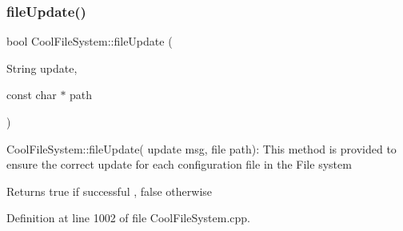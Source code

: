 \subsubsection{\texorpdfstring{file\+Update()}{fileUpdate()}}
{\footnotesize\ttfamily bool Cool\+File\+System\+::file\+Update (\begin{DoxyParamCaption}\item[{String}]{update,  }\item[{const char $\ast$}]{path }\end{DoxyParamCaption})}

Cool\+File\+System\+::file\+Update( update msg, file path)\+: This method is provided to ensure the correct update for each configuration file in the File system

\begin{DoxyReturn}{Returns}
true if successful , false otherwise 
\end{DoxyReturn}


Definition at line 1002 of file Cool\+File\+System.\+cpp.


